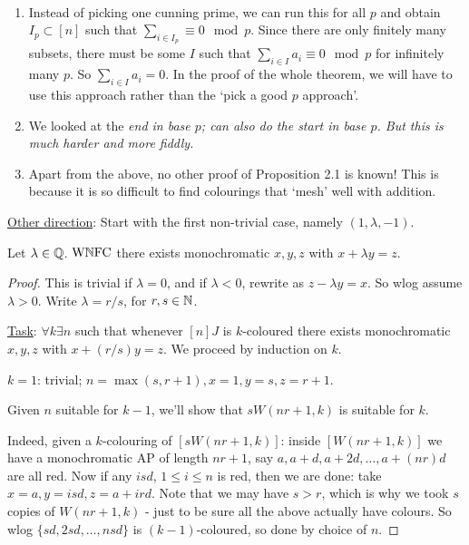 \documentclass[10pt]{article}
\newcommand{\wnfc}{\textrm{W}\N\textrm{FC}}
\begin{document}
\begin{remark*}[Remarks]\ 
    \begin{enumerate}
        \item Instead of picking one cunning prime, we can run this for all $p$ and obtain $I_p\subset [n]$ such that $\sum_{i\in I_p} \equiv 0\mod p$. Since there are only finitely many subsets, there must be some $I$ such that $\sum_{i\in I}a_i\equiv 0\mod p$ for infinitely many $p$. So $\sum_{i\in I}a_i = 0$. In the proof of the whole theorem, we will have to use this approach rather than the `pick a good $p$ approach'.
        \item We looked at the \it{end} in base $p$; can also do the \it{start} in base $p$. But this is much harder and more fiddly.
        \item Apart from the above, no other proof of Proposition 2.1 is known! This is because it is so difficult to find colourings that `mesh' well with addition.
    \end{enumerate}
\end{remark*}

\underline{Other direction}: Start with the first non-trivial case, namely $(1,\lambda,-1)$.

\begin{lemma}
    Let $\lambda \in \mathbb{Q}$. $\wnfc$ there exists monochromatic $x,y,z$ with $ x + \lambda y = z$.
\end{lemma}
\begin{proof}
    This is trivial if $\lambda = 0$, and if $\lambda < 0$, rewrite as $z - \lambda y = x$. So wlog assume $\lambda > 0$. Write $\lambda = r/s$, for $r,s\in\mathbb{N}$.

    \underline{Task}: $\forall k\exists n$ such that whenever $[n]J$ is $k$-coloured there exists monochromatic $x,y,z$ with $ x + (r/s)y = z$. We proceed by induction on $k$.

    $k = 1$: trivial; $n = \max (s,r+1), x = 1, y=s,z=r+1$.

    Given $n$ suitable for $k-1$, we'll show that $sW(nr+1,k)$ is suitable for $k$.

    Indeed, given a $k$-colouring of $[sW(nr+1,k)]$: inside $[W(nr+1,k)]$ we have a monochromatic AP of length $nr+1$, say $a,a+d,a+2d,\dots,a+(nr)d$ are all red. Now if any $isd$, $1\le i\le n$ is red, then we are done: take $x = a, y = isd, z = a + ird$. Note that we may have $s > r$, which is why we took $s$ copies of $W(nr+1,k)$ - just to be sure all the above actually have colours. So wlog $\{sd,2sd,\dots,nsd\}$ is $(k-1)$-coloured, so done by choice of $n$.
\end{proof}
\end{document}
